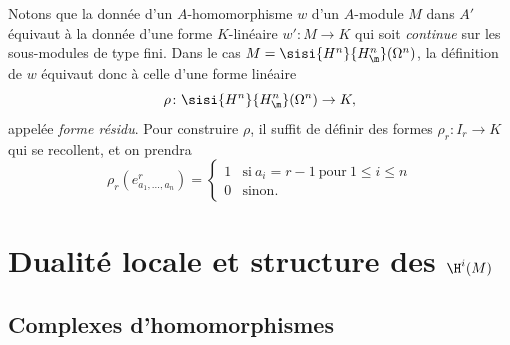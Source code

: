 \begin{remarque}
Notons que la donn\'ee d'un $A$-homomorphisme $w$ d'un $A$-module $M$ dans $A'$ \'equivaut \`a la donn\'ee d'une forme $K$-lin\'eaire $w':M\to K$ qui soit \emph{continue} sur les sous-modules de type fini. Dans le cas $M=\sisi{H^{n}}{{H^n_\m}}(\Omega^{n})$, la d\'efinition de $w$ \'equivaut donc \`a celle d'une forme lin\'eaire
$$
\rho \colon \sisi{H^{n}}{{H^n_\m}}(\Omega^{n})\to K,
$$
appel\'ee \emph{forme r\'esidu}\label{pagecithar}. Pour construire $\rho$, il suffit de d\'efinir des formes $\rho_{r}:I_{r}\to K$ qui se recollent, et on prendra
$$
\rho_{r}(e_{a_{1}, \ldots, a_{n}}^{r})=
\begin{cases}
1&\text{si}\ a_{i}=r-1\ \text{pour}\ 1\leq i\leq n\\
0& \text{sinon.}
\end{cases}
$$
\end{remarque}


\chapter{Dualit\'e locale et structure des $\H^i(M)$}\label{V}

\renewcommand{\theequation}{\arabic{equation}}

\section{Complexes d'homomorphismes} \label{V.1}

